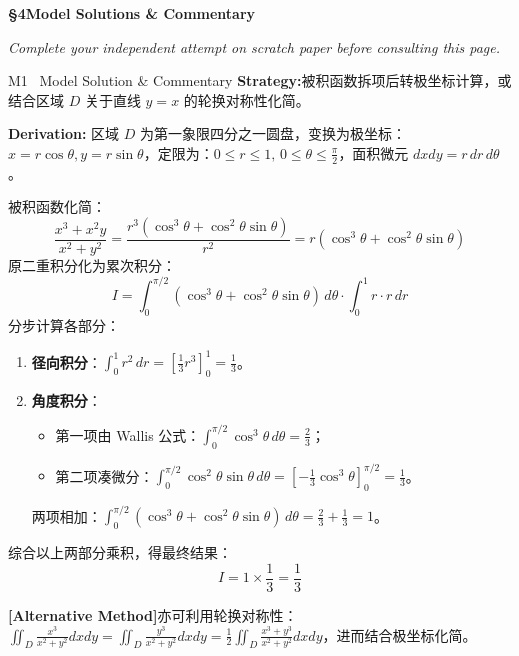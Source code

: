 \documentclass[a4paper,11pt]{article}
\newcommand{\alerttag}[1]{\textcolor{wine}{\sffamily\bfseries [#1]}}
\begin{document}
\clearpage

{\Large\sffamily\bfseries\color{navy} \S 4\quad Model Solutions \& Commentary}

\vspace{1pt}
{\small\color{mist}\itshape\hspace{1pt} Complete your independent attempt on scratch paper before consulting this page.}

\vspace{6pt}

\begin{solution}{M1 \textperiodcentered\ Model Solution \& Commentary}
\textbf{Strategy:}\enspace 被积函数拆项后转极坐标计算，或结合区域 $D$ 关于直线 $y = x$ 的轮换对称性化简。

\vspace{1.5mm}
\textbf{Derivation:}\enspace
区域 $D$ 为第一象限四分之一圆盘，变换为极坐标：$x = r\cos\theta, y = r\sin\theta$，定限为：$0 \le r \le 1, \, 0 \le \theta \le \frac{\pi}{2}$，面积微元 $dxdy = r\,dr\,d\theta$。

被积函数化简：
\[
  \frac{x^3 + x^2 y}{x^2 + y^2} = \frac{r^3(\cos^3\theta + \cos^2\theta\sin\theta)}{r^2} = r(\cos^3\theta + \cos^2\theta\sin\theta)
\]
原二重积分化为累次积分：
\[
  I = \int_0^{\pi/2} (\cos^3\theta + \cos^2\theta\sin\theta)\,d\theta \cdot \int_0^1 r \cdot r\,dr
\]
分步计算各部分：
\begin{enumerate}[leftmargin=1.5em, itemsep=1pt, topsep=1pt]
  \item \textbf{径向积分}：$\int_0^1 r^2\,dr = \left[\frac{1}{3}r^3\right]_0^1 = \frac{1}{3}$。
  \item \textbf{角度积分}：
    \begin{itemize}[leftmargin=1.2em, itemsep=1pt]
      \item 第一项由 Wallis 公式：$\int_0^{\pi/2} \cos^3\theta\,d\theta = \frac{2}{3}$；
      \item 第二项凑微分：$\int_0^{\pi/2} \cos^2\theta\sin\theta\,d\theta = \left[-\frac{1}{3}\cos^3\theta\right]_0^{\pi/2} = \frac{1}{3}$。
    \end{itemize}
    两项相加：$\int_0^{\pi/2} (\cos^3\theta + \cos^2\theta\sin\theta)\,d\theta = \frac{2}{3} + \frac{1}{3} = 1$。
\end{enumerate}
综合以上两部分乘积，得最终结果：
\[
  I = 1 \times \frac{1}{3} = \frac{1}{3}
\]

\begin{notebox}
\alerttag{Alternative Method}\enspace 亦可利用轮换对称性：$\iint_D \frac{x^3}{x^2+y^2}dxdy = \iint_D \frac{y^3}{x^2+y^2}dxdy = \frac{1}{2}\iint_D \frac{x^3+y^3}{x^2+y^2}dxdy$，进而结合极坐标化简。
\end{notebox}
\end{solution}
\end{document}
